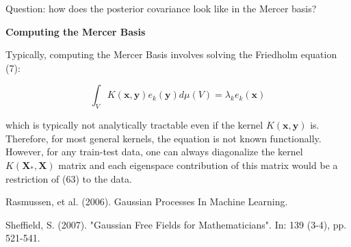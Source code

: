 \documentclass[11pt]{article}
\theoremstyle{plain} %
\theoremstyle{remark}
\begin{document}
Question: how does the posterior covariance look like in the Mercer basis?

\textbf{Computing the Mercer Basis}

Typically, computing the Mercer Basis involves solving the Friedholm equation
(7):

$$
  \int_{V} K(\mathbf{x}, \mathbf{y}) e_{k}(\mathbf{y}) d \mu(V)=\lambda_{k} e_{k}(\mathbf{x})
$$

which is typically not analytically tractable even if the kernel $K(\mathbf{x},
  \mathbf{y})$ is. Therefore, for most general kernels, the equation is not known
functionally. However, for any train-test data, one can always diagonalize the
kernel $K\left(\mathbf{X}_{*}, \mathbf{X}\right)$ matrix and each eigenspace
contribution of this matrix would be a restriction of (63) to the data.

\begin{thebibliography}{2}
  Rasmussen, et al. (2006). Gaussian Processes In Machine Learning.

  Sheffield, S. (2007). "Gaussian Free Fields for Mathematicians". In: 139 (3-4), pp. 521-541.
\end{thebibliography}
\end{document}
